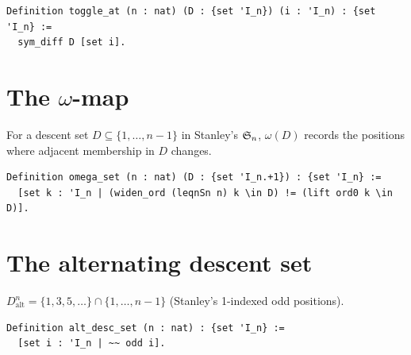 
\begin{lstlisting}[language=Rocq]
Definition toggle_at (n : nat) (D : {set 'I_n}) (i : 'I_n) : {set 'I_n} :=
  sym_diff D [set i].
\end{lstlisting}


\section{The $\omega$-map}

For a descent set $D \subseteq \{1, \dots, n-1\}$ in Stanley's
$\mathfrak{S}_{n}$, $\omega(D)$ records the positions where adjacent
membership in $D$ changes.

\begin{lstlisting}[language=Rocq]
Definition omega_set (n : nat) (D : {set 'I_n.+1}) : {set 'I_n} :=
  [set k : 'I_n | (widen_ord (leqnSn n) k \in D) != (lift ord0 k \in D)].
\end{lstlisting}


\section{The alternating descent set}

\begin{definition}
  $D_{\mathrm{alt}}^n = \{1, 3, 5, \dots\} \cap \{1, \dots, n-1\}$
  (Stanley's 1-indexed odd positions).
\end{definition}

\begin{lstlisting}[language=Rocq]
Definition alt_desc_set (n : nat) : {set 'I_n} :=
  [set i : 'I_n | ~~ odd i].
\end{lstlisting}

